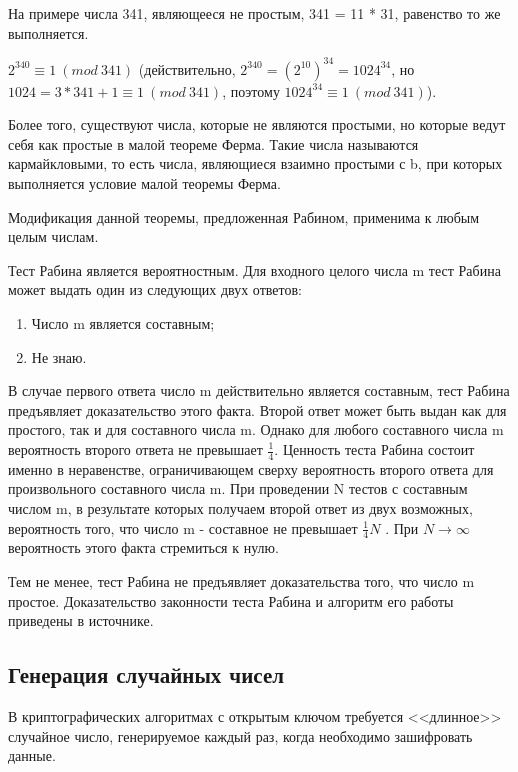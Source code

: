 На примере числа 341, являющееся не простым, 341 = 11 * 31, равенство то же
выполняется.

$2^{340} \equiv 1 \ (mod \ 341)$ (действительно, $2^{340} = (2^{10})^{34} =
1024^{34}$, но $1024 = 3 * 341 + 1 \equiv 1 \ (mod \ 341)$, поэтому $1024^{34} \equiv 1
\ (mod \ 341)$).

Более того, существуют числа, которые не являются простыми, но которые ведут
себя как простые в малой теореме Ферма. Такие числа называются кармайкловыми, то
есть числа, являющиеся взаимно простыми с b, при которых выполняется условие
малой теоремы Ферма.

Модификация данной теоремы, предложенная Рабином, применима к любым целым
числам.

Тест Рабина является вероятностным. Для входного целого числа m тест Рабина
может выдать один из следующих двух ответов:
\begin{enumerate}
  \item Число m является составным;
  \item Не знаю.
\end{enumerate}

В случае первого ответа число m действительно является составным, тест Рабина
предъявляет доказательство этого факта. Второй ответ может быть выдан как для
простого, так и для составного числа m. Однако для любого составного числа m
вероятность второго ответа не превышает $\frac{1}{4}$. Ценность теста Рабина
состоит именно в неравенстве, ограничивающем сверху вероятность второго ответа для
произвольного составного числа m.
При проведении N тестов с составным числом m, в результате которых получаем
второй ответ из двух возможных,  вероятность того, что число m - составное не
превышает  $\frac{1}{4}N$ . При $N \rightarrow \infty$  вероятность этого факта
стремиться к нулю.

Тем не менее, тест Рабина не предъявляет доказательства того, что число m простое.
Доказательство законности теста Рабина и алгоритм его работы приведены в
источнике.~\cite{rabin}

\subsection{Генерация случайных чисел}
В криптографических алгоритмах с открытым ключом требуется <<длинное>> случайное
число, генерируемое каждый раз, когда необходимо зашифровать данные.

